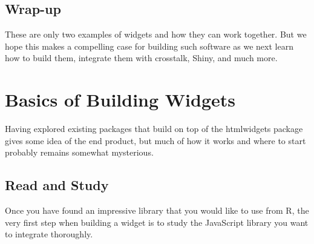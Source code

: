 \documentclass[10pt,]{krantz}
\begin{document}
\hypertarget{widgets-intro-conclude}{%
\section{Wrap-up}\label{widgets-intro-conclude}}

These are only two examples of widgets and how they can work together. But we hope this makes a compelling case for building such software as we next learn how to build them, integrate them with crosstalk, Shiny, and much more.

\hypertarget{widgets-basics}{%
\chapter{Basics of Building Widgets}\label{widgets-basics}}

Having explored existing packages that build on top of the htmlwidgets package gives some idea of the end product, but much of how it works and where to start probably remains somewhat mysterious.

\hypertarget{widgets-basics-study}{%
\section{Read and Study}\label{widgets-basics-study}}

Once you have found an impressive library that you would like to use from R, the very first step when building a widget is to study the JavaScript library you want to integrate thoroughly.
\end{document}
